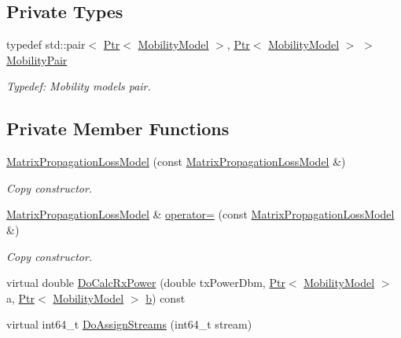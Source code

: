 \subsection*{Private Types}
\begin{DoxyCompactItemize}
\item 
typedef std\+::pair$<$ \hyperlink{classns3_1_1Ptr}{Ptr}$<$ \hyperlink{classns3_1_1MobilityModel}{Mobility\+Model} $>$, \hyperlink{classns3_1_1Ptr}{Ptr}$<$ \hyperlink{classns3_1_1MobilityModel}{Mobility\+Model} $>$ $>$ \hyperlink{classns3_1_1MatrixPropagationLossModel_acbe65d220c793b458010f103df4641cf}{Mobility\+Pair}
\begin{DoxyCompactList}\small\item\em Typedef\+: Mobility models pair. \end{DoxyCompactList}\end{DoxyCompactItemize}
\subsection*{Private Member Functions}
\begin{DoxyCompactItemize}
\item 
\hyperlink{classns3_1_1MatrixPropagationLossModel_aa9b290381c04522e2ee9317deda7b91b}{Matrix\+Propagation\+Loss\+Model} (const \hyperlink{classns3_1_1MatrixPropagationLossModel}{Matrix\+Propagation\+Loss\+Model} \&)
\begin{DoxyCompactList}\small\item\em Copy constructor. \end{DoxyCompactList}\item 
\hyperlink{classns3_1_1MatrixPropagationLossModel}{Matrix\+Propagation\+Loss\+Model} \& \hyperlink{classns3_1_1MatrixPropagationLossModel_ae61be7dea8ad055b7594945e836e677e}{operator=} (const \hyperlink{classns3_1_1MatrixPropagationLossModel}{Matrix\+Propagation\+Loss\+Model} \&)
\begin{DoxyCompactList}\small\item\em Copy constructor. \end{DoxyCompactList}\item 
virtual double \hyperlink{classns3_1_1MatrixPropagationLossModel_a4649eb6bce87bdcb8a721b675235dd26}{Do\+Calc\+Rx\+Power} (double tx\+Power\+Dbm, \hyperlink{classns3_1_1Ptr}{Ptr}$<$ \hyperlink{classns3_1_1MobilityModel}{Mobility\+Model} $>$ a, \hyperlink{classns3_1_1Ptr}{Ptr}$<$ \hyperlink{classns3_1_1MobilityModel}{Mobility\+Model} $>$ \hyperlink{lte__pathloss_8m_a21ad0bd836b90d08f4cf640b4c298e7c}{b}) const 
\item 
virtual int64\+\_\+t \hyperlink{classns3_1_1MatrixPropagationLossModel_a0539496180ae73b9d14b2f6df696e782}{Do\+Assign\+Streams} (int64\+\_\+t stream)
\end{DoxyCompactItemize}
